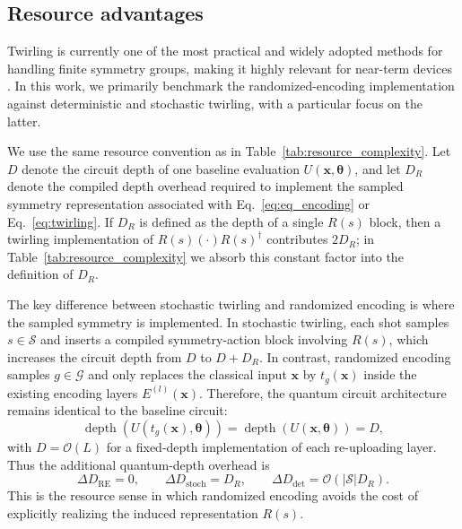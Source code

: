 \documentclass[%
 reprint,
 amsmath,amssymb,
 aps,
 pra,
]{revtex4-2}
\theoremstyle{definition}
\begin{document}
\subsection{Resource advantages}
\label{sec:randomized_encoding_advantage}

Twirling is currently one of the most practical and widely adopted methods for handling finite symmetry groups, making it highly relevant for near-term devices \cite{Nguyen2024,Cenk2024}. In this work, we primarily benchmark the randomized-encoding implementation against deterministic and stochastic twirling, with a particular focus on the latter.

We use the same resource convention as in Table~\ref{tab:resource_complexity}. Let \(D\) denote the circuit depth of one baseline evaluation \(U(\bm{x},\bm{\theta})\), and let \(D_R\) denote the compiled depth overhead required to implement the sampled symmetry representation associated with Eq.~\eqref{eq:eq_encoding} or Eq.~\eqref{eq:twirling}. If \(D_R\) is defined as the depth of a single \(R(s)\) block, then a twirling implementation of \(R(s)(\cdot)R(s)^\dagger\) contributes \(2D_R\); in Table~\ref{tab:resource_complexity} we absorb this constant factor into the definition of \(D_R\).

The key difference between stochastic twirling and randomized encoding is where the sampled symmetry is implemented. In stochastic twirling, each shot samples \(s\in\mathcal{S}\) and inserts a compiled symmetry-action block involving \(R(s)\), which increases the circuit depth from \(D\) to \(D+D_R\). In contrast, randomized encoding samples \(g\in\mathcal{G}\) and only replaces the classical input \(\bm{x}\) by \(t_g(\bm{x})\) inside the existing encoding layers \(E^{(l)}(\bm{x})\). Therefore, the quantum circuit architecture remains identical to the baseline circuit:
\begin{equation}
    \operatorname{depth}\!\left(U(t_g(\bm{x}),\bm{\theta})\right)
    =
    \operatorname{depth}\!\left(U(\bm{x},\bm{\theta})\right)
    =
    D,
\end{equation}
with \(D=\mathcal{O}(L)\) for a fixed-depth implementation of each re-uploading layer. Thus the additional quantum-depth overhead is
\begin{equation}
    \Delta D_{\mathrm{RE}}=0,
    \qquad
    \Delta D_{\mathrm{stoch}}=D_R,
    \qquad
    \Delta D_{\mathrm{det}}=\mathcal{O}(|\mathcal{S}|D_R).
\end{equation}
This is the resource sense in which randomized encoding avoids the cost of explicitly realizing the induced representation \(R(s)\).
\end{document}
